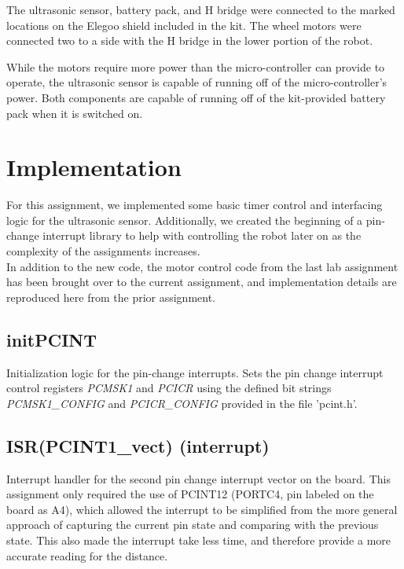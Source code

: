 \documentclass[letterpaper,11pt]{texMemo} %
\begin{document}
The ultrasonic sensor, battery pack, and H bridge were connected to the marked locations on the Elegoo shield included in the kit. The wheel motors were connected two to a side with the H bridge in the lower portion of the robot.

While the motors require more power than the micro-controller can provide to operate, the ultrasonic sensor is capable of running off of the micro-controller's power. Both components are capable of running off of the kit-provided battery pack when it is switched on.



\section*{Implementation}
For this assignment, we implemented some basic timer control and interfacing logic for the ultrasonic sensor. Additionally, we created the beginning of a pin-change interrupt library to help with controlling the robot later on as the complexity of the assignments increases.\\

In addition to the new code, the motor control code from the last lab assignment has been brought over to the current assignment, and implementation details are reproduced here from the prior assignment.

\subsection*{initPCINT}
Initialization logic for the pin-change interrupts. Sets the pin change interrupt control registers \textit{PCMSK1} and \textit{PCICR} using the defined bit strings \textit{PCMSK1\_CONFIG} and \textit{PCICR\_CONFIG} provided in the file 'pcint.h'.

\subsection*{ISR(PCINT1_vect) (interrupt)}
Interrupt handler for the second pin change interrupt vector on the board. This assignment only required the use of PCINT12 (PORTC4, pin labeled on the board as A4), which allowed the interrupt to be simplified from the more general approach of capturing the current pin state and comparing with the previous state. This also made the interrupt take less time, and therefore provide a more accurate reading for the distance.
\end{document}
